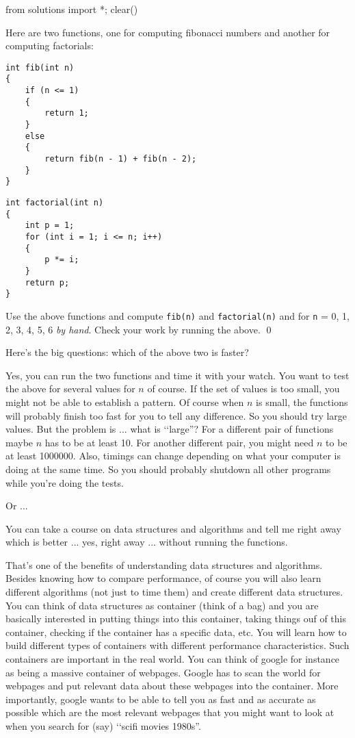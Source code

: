 \begin{python0}
from solutions import *; clear()
\end{python0}

Here are two functions, one for computing fibonacci numbers and another
for computing factorials:
\begin{Verbatim}[frame=single,fontsize=\footnotesize]
int fib(int n)
{
    if (n <= 1)
    {
        return 1;
    }
    else 
    {
        return fib(n - 1) + fib(n - 2);
    }
}
\end{Verbatim}
\begin{Verbatim}[frame=single,fontsize=\footnotesize]
int factorial(int n)
{
    int p = 1;
    for (int i = 1; i <= n; i++)
    {
        p *= i;
    }
    return p;
}
\end{Verbatim}

\begin{ex}
Use the above functions and compute
\verb!fib(n)! and
\verb!factorial(n)! and
for \verb!n! = 0, 1, 2, 3, 4, 5, 6 \textit{by hand}.
Check your work by running the above.
\qed
\end{ex}

Here's the big questions:
which of the above two is faster?

Yes, you can run the two functions and time it with your watch.
You want to test the above for several values for $n$ of course.
If the set of values is too small, you might not be able to establish a 
pattern. Of course when $n$ is small, the functions will probably
 finish too fast for you to tell any difference. 
So you should try large values.
But the problem is ... what is \lq\lq large''?
For a different pair of functions maybe $n$ has to be at least 10.
For another different pair, you might need $n$ to be at least 1000000.
Also, timings can change depending on what your computer is doing at the same
time.
So you should probably shutdown all other programs while you're doing
the tests.


Or ... 

You can take a course on 
data structures and algorithms and tell me right away which is better ...
yes, right away ... without running the functions.

That's one of the benefits of understanding data structures and 
algorithms.
Besides knowing how to compare performance, of course you 
will also learn different algorithms (not just to time them)
and create different data structures.
You can think of data structures as container (think of a bag)
and you are basically interested in putting things into this 
container, taking things ouf of this container, checking if the container
has a specific data, etc. 
You will learn how to build different types of containers with 
different performance characteristics.
Such containers are important in the real world.
You can think of google for instance as being a massive
container of webpages.
Google has to scan the world for webpages and put relevant data
about these webpages into the container.
More importantly, google wants to be able to tell you as fast
and as accurate as possible which are the most relevant webpages
that you might want to look at when you search for (say)
\lq\lq scifi movies 1980s''. 
